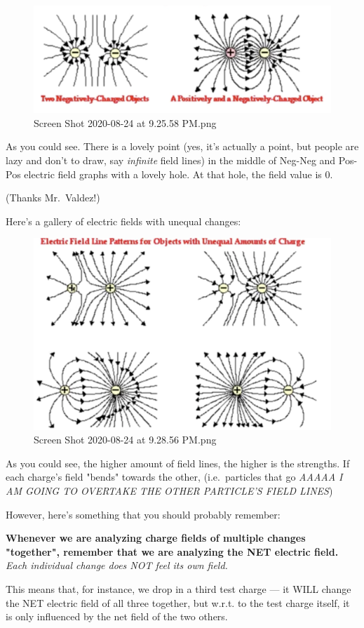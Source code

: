 \documentclass[letterpaper]{article}
\begin{document}
\begin{figure}[htbp]
\centering
\includegraphics[width=.9\linewidth]{./Screen Shot 2020-08-24 at 9.25.58 PM.png}
\caption{Screen Shot 2020-08-24 at 9.25.58 PM.png}
\end{figure}

As you could see. There is a lovely point (yes, it's actually a point,
but people are lazy and don't to draw, say \emph{infinite} field lines) in
the middle of Neg-Neg and Pos-Pos electric field graphs with a lovely
hole. At that hole, the field value is 0.

(Thanks Mr. Valdez!)

Here's a gallery of electric fields with unequal changes:

\begin{figure}[htbp]
\centering
\includegraphics[width=.9\linewidth]{./Screen Shot 2020-08-24 at 9.28.56 PM.png}
\caption{Screen Shot 2020-08-24 at 9.28.56 PM.png}
\end{figure}

As you could see, the higher amount of field lines, the higher is the
strengths. If each charge's field "bends" towards the other,
(i.e. particles that go \emph{AAAAA I AM GOING TO OVERTAKE THE OTHER
PARTICLE'S FIELD LINES})

However, here's something that you should probably remember:

\textbf{Whenever we are analyzing charge fields of multiple changes "together",
remember that we are analyzing the NET electric field.} \emph{Each individual
change does NOT feel its own field.}

This means that, for instance, we drop in a third test charge --- it
WILL change the NET electric field of all three together, but w.r.t. to
the test charge itself, it is only influenced by the net field of the
two others.
\end{document}
